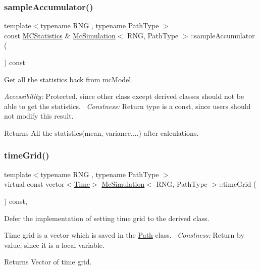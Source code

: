 \subsubsection{\texorpdfstring{sample\+Accumulator()}{sampleAccumulator()}}
{\footnotesize\ttfamily template$<$typename R\+NG , typename Path\+Type $>$ \\
const \hyperlink{class_m_c_statistics}{M\+C\+Statistics} \& \hyperlink{class_mc_simulation}{Mc\+Simulation}$<$ R\+NG, Path\+Type $>$\+::sample\+Accumulator (\begin{DoxyParamCaption}{ }\end{DoxyParamCaption}) const\hspace{0.3cm}{\ttfamily [protected]}}



Get all the statistics back from mc\+Model. 

{\itshape Accessibility\+:} Protected, since other class except derived classes should not be able to get the statistics.~\newline
{\itshape Constness\+:} Return type is a const, since users should not modify this result. \begin{DoxyReturn}{Returns}
All the statistics(mean, variance,...) after calculations. 
\end{DoxyReturn}
\hypertarget{class_mc_simulation_acf7d24981be3025a2cf07f8623dbe8ce}{}\label{class_mc_simulation_acf7d24981be3025a2cf07f8623dbe8ce} 
\subsubsection{\texorpdfstring{time\+Grid()}{timeGrid()}}
{\footnotesize\ttfamily template$<$typename R\+NG , typename Path\+Type $>$ \\
virtual const vector$<$\hyperlink{_name_def_8h_ac2d3e0ba793497bcca555c7c2cf64ff3}{Time}$>$ \hyperlink{class_mc_simulation}{Mc\+Simulation}$<$ R\+NG, Path\+Type $>$\+::time\+Grid (\begin{DoxyParamCaption}{ }\end{DoxyParamCaption}) const\hspace{0.3cm}{\ttfamily [private]}, {}}



Defer the implementation of setting time grid to the derived class. 

Time grid is a vector which is saved in the \hyperlink{class_path}{Path} class.~\newline
{\itshape Constness\+:} Return by value, since it is a local variable. \begin{DoxyReturn}{Returns}
Vector of time grid. 
\end{DoxyReturn}


